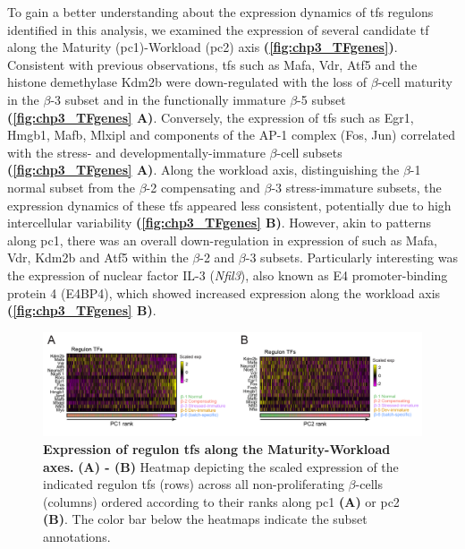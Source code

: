 
\par To gain a better understanding about the expression dynamics of \glspl{tf} regulons identified in this analysis, we examined the expression of several candidate \gls{tf} along the Maturity (\gls{pc}1)-Workload (\gls{pc}2) axis \textbf{(\autoref{fig:chp3_TFgenes})}. Consistent with previous observations, \glspl{tf} such as Mafa, Vdr, Atf5 and the histone demethylase Kdm2b were down-regulated with the loss of $\beta$-cell maturity in the $\beta$-3 subset and in the functionally immature $\beta$-5 subset \textbf{(\autoref{fig:chp3_TFgenes} A)}. Conversely, the expression of \glspl{tf} such as Egr1, Hmgb1, Mafb, Mlxipl and components of the AP-1 complex (Fos, Jun) correlated with the stress- and developmentally-immature $\beta$-cell subsets \textbf{(\autoref{fig:chp3_TFgenes} A)}. Along the workload axis, distinguishing the $\beta$-1 normal subset from the $\beta$-2 compensating and $\beta$-3 stress-immature subsets, the expression dynamics of these \glspl{tf} appeared less consistent, potentially due to high intercellular variability \textbf{(\autoref{fig:chp3_TFgenes} B)}. However, akin to patterns along \gls{pc}1, there was an overall down-regulation in expression of such as Mafa, Vdr, Kdm2b and Atf5 within the $\beta$-2 and $\beta$-3 subsets. Particularly interesting was the expression of nuclear factor IL-3 (\textit{Nfil3}), also known as E4 promoter-binding protein 4 (E4BP4), which showed increased expression along the workload axis \textbf{(\autoref{fig:chp3_TFgenes} B)}. 

\begin{figure}[H]
    \centering
    \includegraphics[width=\linewidth]{Chapter5/Fig/F3-19-01.png}
    \caption[Expression of regulons along the Maturity-Workload axes]{\textbf{Expression of regulon \glspl{tf} along the Maturity-Workload axes.} \textbf{(A) - (B)} Heatmap depicting the scaled expression of the indicated regulon \glspl{tf} (rows) across all non-proliferating $\beta$-cells (columns) ordered according to their ranks along \gls{pc}1 \textbf{(A)} or \gls{pc}2 \textbf{(B)}. The color bar below the heatmaps indicate the subset annotations. }
    \label{fig:chp3_TFgenes}
\end{figure}

